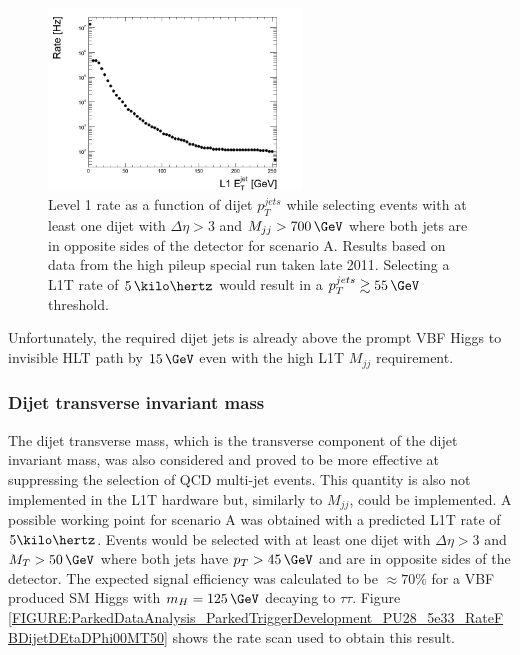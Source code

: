 \begin{figure}[!htb]
\centering
\includegraphics[width=0.60\textwidth]{Chapter06/Trigger/Images/PU28_5e33_RateFBDijetDEtaDPhi00M700.png}
\caption[Level 1 rate as a function of dijet $p_T^{jets}$ while selecting events with at least one dijet with $\Delta\eta>3$ and $M_{jj}>700\,\GeV$ where both jets are in opposite sides of the detector for scenario A.]
{Level 1 rate as a function of dijet $p_T^{jets}$ while selecting events with at least one dijet with $\Delta\eta>3$ and $M_{jj}>700\,\GeV$ where both jets are in opposite sides of the detector for scenario A. Results based on data from the high pileup special run taken late 2011. Selecting a \gls{L1T} rate of $5\,\kilo\hertz$ would result in a $p_T^{jets} \gtrsim 55\,\GeV$ threshold.}
\label{FIGURE:ParkedDataAnalysis_ParkedTriggerDevelopment_PU28_5e33_RateFBDijetDEtaDPhi00M700}
\end{figure}

Unfortunately, the required dijet jets \pt is already above the prompt \gls{VBF} Higgs to invisible \gls{HLT} path by $15\,\GeV$ even with the high \gls{L1T} $M_{jj}$ requirement.

\subsubsection{Dijet transverse invariant mass}


The dijet transverse mass, which is the transverse component of the dijet invariant mass, was also considered and proved to be more effective at suppressing the selection of \gls{QCD} multi-jet events. This quantity is also not implemented in the \gls{L1T} hardware but, similarly to $M_{jj}$, could be implemented. A possible working point for scenario A was obtained with a predicted \gls{L1T} rate of $5\kilo\hertz$. Events would be selected with at least one dijet with $\Delta\eta>3$ and $M_T>50\,\GeV$ where both jets have $p_T > 45\,\GeV$ and are in opposite sides of the detector. The expected signal efficiency was calculated to be $\approx 70\%$ for a \gls{VBF} produced \gls{SM} Higgs with $m_H=125\,\GeV$ decaying to $\tau\tau$. Figure \ref{FIGURE:ParkedDataAnalysis_ParkedTriggerDevelopment_PU28_5e33_RateFBDijetDEtaDPhi00MT50} shows the rate scan used to obtain this result.

